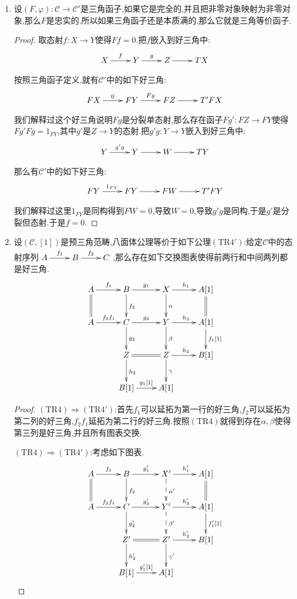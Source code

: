 \begin{enumerate}
	\item 设$(F,\varphi):\mathscr{C}\to\mathscr{C}'$是三角函子,如果它是完全的,并且把非零对象映射为非零对象,那么$F$是忠实的.所以如果三角函子还是本质满的,那么它就是三角等价函子.
	\begin{proof}
		
		取态射$f:X\to Y$使得$Ff=0$.把$f$嵌入到好三角中:
		$$\xymatrix{X\ar[r]^f&Y\ar[r]^g&Z\ar[r]&TX}$$
		
		按照三角函子定义,就有$\mathscr{C}'$中的如下好三角:
		$$\xymatrix{FX\ar[r]^0&FY\ar[r]^{Fg}&FZ\ar[r]&T'FX}$$
		
		我们解释过这个好三角说明$Fg$是分裂单态射,那么存在函子$Fg':FZ\to FY$使得$Fg'Fg=1_{FY}$,其中$g'$是$Z\to Y$的态射.把$g'g:Y\to Y$嵌入到好三角中:
		$$\xymatrix{Y\ar[r]^{g'g}&Y\ar[r]&W\ar[r]&TY}$$
		
		那么有$\mathscr{C}'$中的如下好三角:
		$$\xymatrix{FY\ar[r]^{1_{FY}}&FY\ar[r]&FW\ar[r]&T'FY}$$
		
		我们解释过这里$1_{FY}$是同构得到$FW=0$,导致$W=0$,导致$g'g$是同构,于是$g'$是分裂但态射.于是$f=0$.
	\end{proof}
    \item 设$(\mathscr{C},[1])$是预三角范畴,八面体公理等价于如下公理$(\mathrm{TR}4')$:给定$\mathscr{C}$中的态射序列$\xymatrix{A\ar[r]^{f_1}&B\ar[r]^{f_2}&C}$,那么存在如下交换图表使得前两行和中间两列都是好三角.
    $$\xymatrix{A\ar[r]^{f_1}\ar@{=}[d]&B\ar[r]^{g_1}\ar[d]^{f_2}&X\ar[r]^{h_1}\ar[d]^{\alpha}&A[1]\ar@{=}[d]\\A\ar[r]^{f_2f_1}&C\ar[r]^{g_3}\ar[d]^{g_2}&Y\ar[r]^{h_3}\ar[d]^{\beta}&A[1]\ar[d]^{f_1[1]}\\&Z\ar@{=}[r]\ar[d]^{h_2}&Z\ar[r]^{h_2}\ar[d]^{\gamma}&B[1]\\&B[1]\ar[r]^{g_1[1]}&A[1]&}$$
    \begin{proof}
    	
    	$(\mathrm{TR}4)\Rightarrow(\mathrm{TR}4')$:首先$f_1$可以延拓为第一行的好三角,$f_2$可以延拓为第二列的好三角,$f_2f_1$延拓为第二行的好三角.按照$(\mathrm{TR}4)$就得到存在$\alpha,\beta$使得第三列是好三角,并且所有图表交换.
    	
    	\qquad
    	
    	$(\mathrm{TR}4)\Rightarrow(\mathrm{TR}4')$:考虑如下图表.
    	$$\xymatrix{A\ar[r]^{f_1}\ar@{=}[d]&B\ar[r]^{g_1'}\ar[d]^{f_2}&X'\ar[r]^{h_1'}\ar@{-->}[d]^{\alpha'}&A[1]\ar@{=}[d]\\A\ar[r]^{f_2f_1}&C\ar[r]^{g_3'}\ar[d]^{g_2'}&Y'\ar[r]^{h_3'}\ar@{-->}[d]^{\beta'}&A[1]\ar[d]^{f_1'[1]}\\&Z'\ar@{=}[r]\ar[d]^{h_2'}&Z'\ar[r]^{h_2'}\ar[d]^{\gamma'}&B[1]\\&B[1]\ar[r]^{g_1'[1]}&A[1]&}$$
    	

\end{proof}
\end{enumerate}
